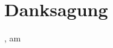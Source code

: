 
\chapter*{Danksagung}

\vspace{1.5cm}

\begin{center}
\raggedleft{\campusAuthor}
\end{center}

\vspace{1.5cm}

\campusCity, am \campusDate
